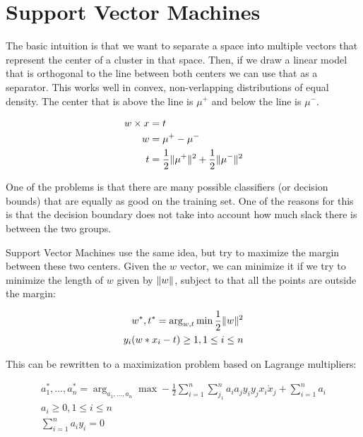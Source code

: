 \section{Support Vector Machines}

The basic intuition is that we want to separate a space
into multiple vectors that represent the center of a cluster
in that space. Then, if we draw a linear model that is orthogonal
to the line between both centers we can use that as a separator.
This works well in convex, non-verlapping distributions of equal
density. The center that is above the line is $\mu^+$ and below
the line is $\mu^-$.

\begin{definition}
  \begin{align*}
    w \times x &= t \\
    w &= \mu^+ - \mu^- \\
    t &= \frac{1}{2} \lVert\mu^+\rVert^2 + \frac{1}{2} \lVert\mu^-\rVert^2
  \end{align*}
\end{definition}

One of the problems is that there are many possible classifiers
(or decision bounds) that are equally as good on the training set.
One of the reasons for this is that the decision boundary does not
take into account how much slack there is between the two groups.

Support Vector Machines use the same idea, but try to maximize the margin
between these two centers. Given the $w$ vector, we can minimize it if
we try to minimize the length of $w$ given by $\lVert w\rVert$, subject to that
all the points are outside the margin:

\begin{align*}
  w^*, t^* = \arg_{w,t} \min \frac{1}{2} \lVert w\rVert^2 \\
  y_i(w * x_i - t) \geq 1, 1 \leq i \leq n
\end{align*}

This can be rewritten to a maximization problem
based on Lagrange multipliers:

\begin{align*}
  a_1^*, ..., a_n^* = \arg_{a_1,...,a_n} \max -
  \frac{1}{2} \sum_{i=1}^n \sum_{j_1}^n a_ia_jy_iy_jx_i \dot x_j +
  \sum_{i=1}^n a_i \\
  a_i \geq 0, 1 \leq i \leq n \\
  \sum_{i=1}^n a_iy_i = 0
\end{align*}

